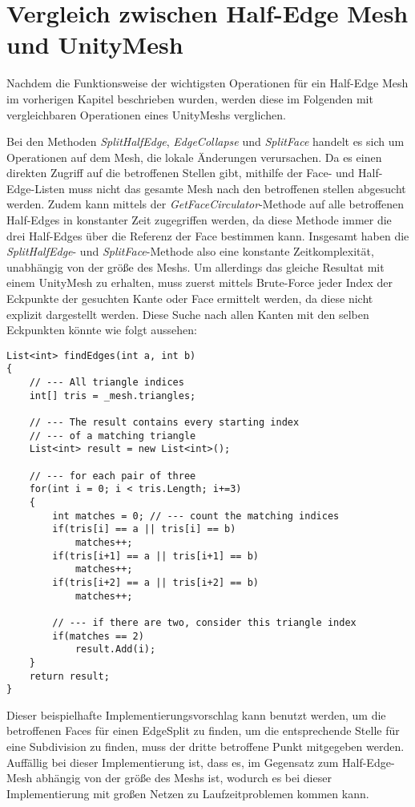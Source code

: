 \section{Vergleich zwischen Half-Edge Mesh und UnityMesh}
Nachdem die Funktionsweise der wichtigsten Operationen f\"ur ein Half-Edge Mesh im vorherigen Kapitel beschrieben wurden, werden diese im Folgenden mit vergleichbaren Operationen eines UnityMeshs verglichen.

Bei den Methoden \textit{SplitHalfEdge}, \textit{EdgeCollapse} und \textit{SplitFace} handelt es sich um Operationen auf dem Mesh, die lokale \"Anderungen verursachen. Da es einen direkten Zugriff auf die betroffenen Stellen gibt, mithilfe der Face- und Half-Edge-Listen muss nicht das gesamte Mesh nach den betroffenen stellen abgesucht werden. Zudem kann mittels der \textit{GetFaceCirculator}-Methode auf alle betroffenen Half-Edges in konstanter Zeit zugegriffen werden, da diese Methode immer die drei Half-Edges \"uber die Referenz der Face bestimmen kann. Insgesamt haben die \textit{SplitHalfEdge}- und \textit{SplitFace}-Methode also eine konstante Zeitkomplexit\"at, unabh\"angig von der gr\"o{\ss}e des Meshs.
Um allerdings das gleiche Resultat mit einem UnityMesh zu erhalten, muss zuerst mittels Brute-Force jeder Index der Eckpunkte der gesuchten Kante oder Face ermittelt werden, da diese nicht explizit dargestellt werden. Diese Suche nach allen Kanten mit den selben Eckpunkten k\"onnte wie folgt aussehen:
\begin{lstlisting}
List<int> findEdges(int a, int b)
{
	// --- All triangle indices
	int[] tris = _mesh.triangles;
	
	// --- The result contains every starting index 
	// --- of a matching triangle
	List<int> result = new List<int>();
	
	// --- for each pair of three
	for(int i = 0; i < tris.Length; i+=3)
	{
		int matches = 0; // --- count the matching indices
		if(tris[i] == a || tris[i] == b)
			matches++;
		if(tris[i+1] == a || tris[i+1] == b)
			matches++;
		if(tris[i+2] == a || tris[i+2] == b)
			matches++;
			
		// --- if there are two, consider this triangle index
		if(matches == 2) 
			result.Add(i);
	}
	return result;
}
\end{lstlisting}
Dieser beispielhafte Implementierungsvorschlag kann benutzt werden, um die betroffenen Faces f\"ur einen EdgeSplit zu finden, um die entsprechende Stelle f\"ur eine Subdivision zu finden, muss der dritte betroffene Punkt mitgegeben werden. Auff\"allig bei dieser Implementierung ist, dass es, im Gegensatz zum Half-Edge-Mesh abh\"angig von der gr\"o{\ss}e des Meshs ist, wodurch es bei dieser Implementierung mit gro{\ss}en Netzen zu Laufzeitproblemen kommen kann.

